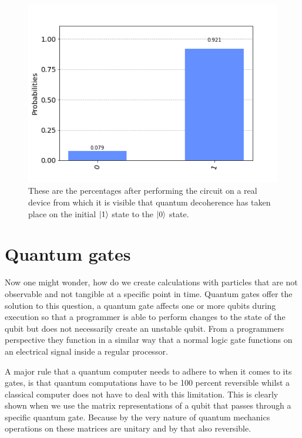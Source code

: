 \begin{figure}[h]
	\centering
	\includegraphics[scale = 0.75]{../Demonstration/img/Quantum_decoherence_graph.PNG}
	\caption{These are the percentages after performing the circuit on a real device from which it is visible that quantum decoherence has taken place on the initial $\ket{1}$ state to the $\ket{0}$ state.}
\end{figure}



\section{Quantum gates}

Now one might wonder, how do we create calculations with particles that are not observable and not tangible at a specific point in time. Quantum gates offer the solution to this question, a quantum gate affects one or more qubits during execution so that a programmer is able to perform changes to the state of the qubit but does not necessarily create an unstable qubit. From a programmers perspective they function in a similar way that a normal logic gate functions on an electrical signal inside a regular processor. 

A major rule that a quantum computer needs to adhere  to when it comes to its gates, is that quantum computations have to be 100 percent reversible whilst a classical computer does not have to deal with this limitation. This is clearly shown when we use the matrix representations of a qubit that passes through a specific quantum gate. Because by the very nature of quantum mechanics operations on these matrices are unitary and by that also reversible.

